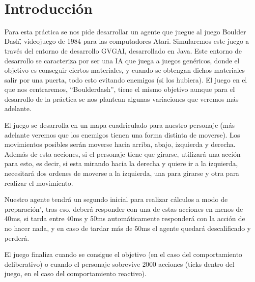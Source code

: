 \documentclass[10pt, spanish]{article}
\makeatletter
\let\thedate\@date
\makeatother
\begin{document}
\begin{titlepage}
    {\large \thedate}\\[0.5cm]
    {\doclicenseThis}
 	
    \vfill
    
\end{titlepage}




\section{Introducción}

Para esta práctica se nos pide desarrollar un agente que juegue al juego \"Boulder Dash\", videojuego de 1984 para las computadores Atari. Simularemos este juego a través del entorno de desarrollo GVGAI, desarrollado en Java. Este entorno de desarrollo se caracteriza por ser una IA que juega a juegos genéricos, donde el objetivo es conseguir ciertos materiales, y cuando se obtengan dichos materiales salir por una puerta, todo esto evitando enemigos (si los hubiera). El juego en el que nos centraremos, ``Boulderdash'', tiene el mismo objetivo aunque para el desarrollo de la práctica se nos plantean algunas variaciones que veremos más adelante.

El juego se desarrolla en un mapa cuadriculado para nuestro personaje (más adelante veremos que los enemigos tienen una forma distinta de moverse). Los movimientos posibles serán moverse hacia arriba, abajo, izquierda y derecha. Además de esta acciones, si el personaje tiene que girarse, utilizará una acción para esto, es decir, si esta mirando hacia la derecha y quiere ir a la izquierda, necesitará dos ordenes de moverse a la izquierda, una para girarse y otra para realizar el movimiento.

Nuestro agente tendrá un segundo inicial para realizar cálculos a modo de preparación', tras eso, deberá responder con una de estas acciones en menos de 40ms, si tarda entre 40ms y 50ms automáticamente responderá con la acción de no hacer nada, y en caso de tardar más de 50ms el agente quedará descalificado y perderá.

El juego finaliza cuando se consigue el objetivo (en el caso del comportamiento deliberativo) o cuando el personaje sobrevive 2000 acciones (ticks dentro del juego, en el caso del comportamiento reactivo).
\end{document}

